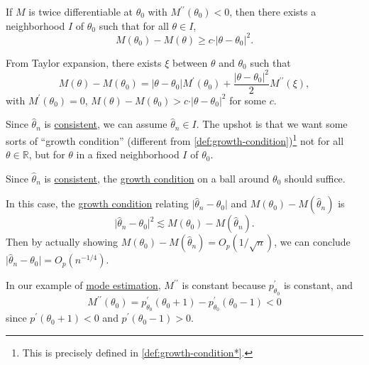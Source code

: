 \begin{remark}
	If \(M\) is twice differentiable at \(\theta _0\) with \(M^{\prime\prime} (\theta _0) < 0\), then there exists a neighborhood \(I\) of \(\theta _0\) such that for all \(\theta \in I\),
	\[
		M(\theta _0) - M(\theta ) \geq c \cdot \vert \theta - \theta _0 \vert ^2.
	\]
\end{remark}
\begin{explanation}
	From Taylor expansion, there exists \(\xi \) between \(\theta \) and \(\theta _0\) such that
	\[
		M(\theta ) - M(\theta _0)
		=  \vert \theta - \theta _0 \vert M^{\prime} (\theta _0) + \frac{ \vert \theta - \theta _0 \vert ^2}{2} M^{\prime\prime} (\xi ),
	\]
	with \(M^{\prime} (\theta _0) = 0\), \(M(\theta ) - M(\theta _0) > c \cdot \vert \theta - \theta _0 \vert ^2\) for some \(c\).
\end{explanation}

Since \(\hat{\theta } _n \) is \hyperref[def:consistent]{consistent}, we can assume \(\hat{\theta } _n \in I\). The upshot is that we want some sorts of ``growth condition'' (different from \autoref{def:growth-condition})\footnote{This is precisely defined in \autoref{def:growth-condition*}.} not for all \(\theta \in \mathbb{R} \), but for \(\theta \) in a fixed neighborhood \(I\) of \(\theta _0\).

\begin{intuition}
	Since \(\hat{\theta } _n \) is \hyperref[def:consistent]{consistent}, the \hyperref[def:growth-condition*]{growth condition} on a ball around \(\theta _0\) should suffice.
\end{intuition}

In this case, the \hyperref[def:growth-condition*]{growth condition} relating \(\vert \hat{\theta } _n - \theta _0 \vert \) and \(M(\theta _0) - M(\hat{\theta} _n ) \) is
\[
	\vert \hat{\theta } _n - \theta _0 \vert ^2 \lesssim M(\theta _0) - M(\hat{\theta} _n ) .
\]
Then by actually showing \(M(\theta _0) - M(\hat{\theta} _n) = O_p(1 / \sqrt{n} )\), we can conclude \(\vert \hat{\theta } _n - \theta _0 \vert = O_p(n^{-1 / 4})\).

\begin{note}
	In our example of \hyperref[eg:mode-estimation]{mode estimation}, \(M^{\prime\prime} \) is constant because \(p_{\theta _0}^{\prime} \) is constant, and
	\[
		M^{\prime\prime} (\theta _0)
		= p_{\theta _0}^{\prime} (\theta _0 + 1) - p_{\theta _0}^{\prime} (\theta _0 - 1)
		< 0
	\]
	since \(p^{\prime} (\theta _0+1) < 0\) and \(p^{\prime} (\theta _0 - 1) > 0\).
\end{note}

